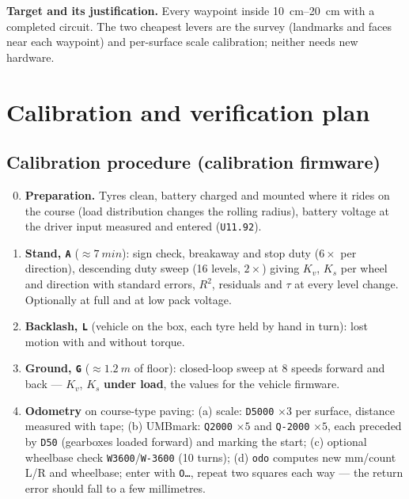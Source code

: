 \documentclass[11pt,a4paper]{article}
\newcommand{\code}[1]{\texttt{\small #1}}
\begin{document}
\begin{keybox}
\textbf{Target and its justification.} Every waypoint inside
\qtyrange{10}{20}{cm} with a completed circuit. The two cheapest levers are the
survey (landmarks and faces near each waypoint) and per-surface scale
calibration; neither needs new hardware.
\end{keybox}

\section{Calibration and verification plan}\label{sec:calib}

\subsection{Calibration procedure (calibration firmware)}

\begin{enumerate}[leftmargin=6mm,label=\arabic*.]
\setcounter{enumi}{-1}
\item \textbf{Preparation.} Tyres clean, battery charged and mounted where it
rides on the course (load distribution changes the rolling radius), battery
voltage at the driver input measured and entered (\code{U11.92}).
\item \textbf{Stand, \code{A}} ($\approx\qty{7}{min}$): sign check, breakaway and
stop duty ($6\times$ per direction), descending duty sweep (16 levels,
$2\times$) giving $K_v$, $K_s$ per wheel and direction with standard errors,
$R^2$, residuals and $\tau$ at every level change. Optionally at full and at low
pack voltage.
\item \textbf{Backlash, \code{L}} (vehicle on the box, each tyre held by hand in
turn): lost motion with and without torque.
\item \textbf{Ground, \code{G}} ($\approx\qty{1.2}{m}$ of floor): closed-loop sweep at
8 speeds forward and back --- $K_v$, $K_s$ \textbf{under load}, the values for the
vehicle firmware.
\item \textbf{Odometry} on course-type paving:
(a) scale: \code{D5000} $\times3$ per surface, distance measured with tape;
(b) UMBmark: \code{Q2000} $\times5$ and \code{Q-2000} $\times5$, each preceded by
\code{D50} (gearboxes loaded forward) and marking the start;
(c) optional wheelbase check \code{W3600}/\code{W-3600} (10 turns);
(d) \code{odo} computes new mm/count L/R and wheelbase; enter with \code{O\ldots},
repeat two squares each way --- the return error should fall to a few millimetres.
\end{enumerate}
\end{document}
